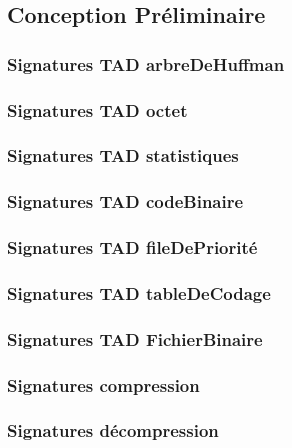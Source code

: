 \subsection{Conception Préliminaire}

\subsubsection{Signatures TAD arbreDeHuffman}


\subsubsection{Signatures TAD octet}


\subsubsection{Signatures TAD statistiques}


\subsubsection{Signatures TAD codeBinaire}


\subsubsection{Signatures TAD fileDePriorité}


\subsubsection{Signatures TAD tableDeCodage}


\subsubsection{Signatures TAD FichierBinaire}


\subsubsection{Signatures compression}


\subsubsection{Signatures décompression}

